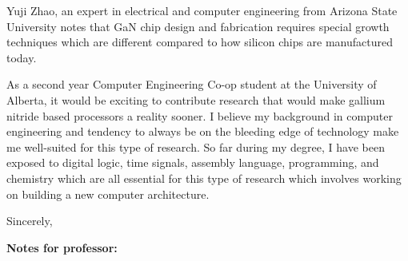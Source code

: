 \documentclass[letterpaper]{letter}
\begin{document}
\begin{letter}
Yuji Zhao, an expert in electrical and computer engineering from Arizona State
University %
notes that GaN chip design and fabrication requires special growth techniques
which are different compared to how silicon chips are manufactured today.

As a second year Computer Engineering Co-op student at the University of
Alberta, it would be exciting to contribute research that would make gallium
nitride based processors a reality sooner. I believe my background in computer
engineering and tendency to always be on the bleeding edge of technology make me
well-suited for this type of research. So far during my degree, I have been
exposed to digital logic, time signals, assembly language, programming, and
chemistry which are all essential for this type of research which involves
working on building a new computer architecture.


\closing{Sincerely,}

\end{letter}
\newpage
\textbf{Notes for professor:}
\end{document}
